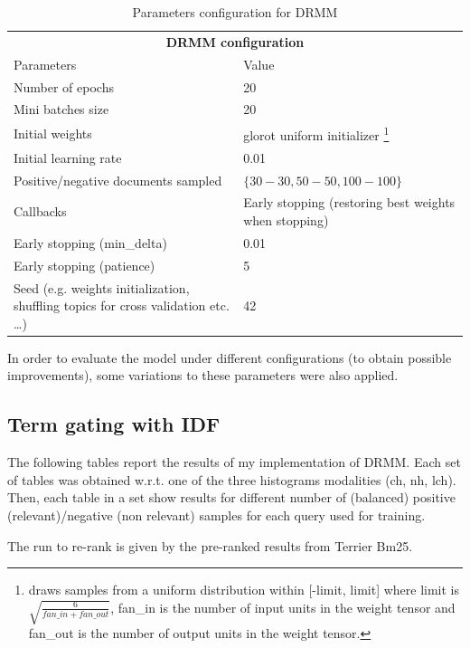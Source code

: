 \begin{table}[H]
\centering
\begin{tabular}{p{8cm}|p{5cm}}
\multicolumn{2}{c}{\textbf{DRMM configuration}} \\
Parameters & Value \\ \hline
Number of epochs & 20 \\
Mini batches size & 20 \\
Initial weights & glorot uniform initializer \footnote{draws samples from a uniform distribution within [-limit, limit] where limit is $\sqrt{\frac{6}{fan\_in + fan\_out}}$, fan\_in is the number of input units in the weight tensor and fan\_out is the number of output units in the weight tensor.} \\
Initial learning rate & 0.01 \\
Positive/negative documents sampled & $\{30-30, 50-50, 100-100\}$ \\
Callbacks & Early stopping (restoring best weights when stopping) \\
Early stopping (min\_delta) & 0.01 \\
Early stopping (patience) & 5 \\
Seed (e.g. weights initialization, shuffling topics for cross validation etc. \dots) & 42
\end{tabular}
\caption{Parameters configuration for DRMM}
\label{table:drmm_config}
\end{table}

In order to evaluate the model under different configurations (to obtain possible improvements), some variations to these parameters were also applied.

\subsection{Term gating with IDF}
\label{ssec:tgidf}

The following tables report the results of my implementation of DRMM. Each set of tables was obtained w.r.t. one of the three histograms modalities (ch, nh, lch). Then, each table in a set show results for different number of (balanced) positive (relevant)/negative (non relevant) samples for each query used for training.

The run to re-rank is given by the pre-ranked results from Terrier Bm25.

